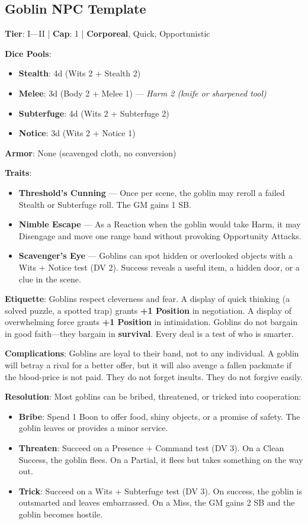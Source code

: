 \subsection{Goblin NPC Template}

\textbf{Tier}: I---II | \textbf{Cap}: 1 | \textbf{Corporeal}, Quick, Opportunistic

\textbf{Dice Pools}:
\begin{itemize}
    \item \textbf{Stealth}: 4d (Wits 2 + Stealth 2)
    \item \textbf{Melee}: 3d (Body 2 + Melee 1) --- \textit{Harm 2 (knife or sharpened tool)}
    \item \textbf{Subterfuge}: 4d (Wits 2 + Subterfuge 2)
    \item \textbf{Notice}: 3d (Wits 2 + Notice 1)
\end{itemize}

\textbf{Armor}: None (scavenged cloth, no conversion)

\textbf{Traits}:
\begin{itemize}
    \item \textbf{Threshold's Cunning} --- Once per scene, the goblin may reroll a failed Stealth or Subterfuge roll. The GM gains 1 SB.
    \item \textbf{Nimble Escape} --- As a Reaction when the goblin would take Harm, it may Disengage and move one range band without provoking Opportunity Attacks.
    \item \textbf{Scavenger's Eye} --- Goblins can spot hidden or overlooked objects with a Wits + Notice test (DV 2). Success reveals a useful item, a hidden door, or a clue in the scene.
\end{itemize}

\textbf{Etiquette}: Goblins respect cleverness and fear. A display of quick thinking (a solved puzzle, a spotted trap) grants \textbf{+1 Position} in negotiation. A display of overwhelming force grants \textbf{+1 Position} in intimidation. Goblins do not bargain in good faith---they bargain in \textbf{survival}. Every deal is a test of who is smarter.

\textbf{Complications}: Goblins are loyal to their band, not to any individual. A goblin will betray a rival for a better offer, but it will also avenge a fallen packmate if the blood-price is not paid. They do not forget insults. They do not forgive easily.

\textbf{Resolution}: Most goblins can be bribed, threatened, or tricked into cooperation:
\begin{itemize}
    \item \textbf{Bribe}: Spend 1 Boon to offer food, shiny objects, or a promise of safety. The goblin leaves or provides a minor service.
    \item \textbf{Threaten}: Succeed on a Presence + Command test (DV 3). On a Clean Success, the goblin flees. On a Partial, it flees but takes something on the way out.
    \item \textbf{Trick}: Succeed on a Wits + Subterfuge test (DV 3). On success, the goblin is outsmarted and leaves embarrassed. On a Miss, the GM gains 2 SB and the goblin becomes hostile.
\end{itemize}

